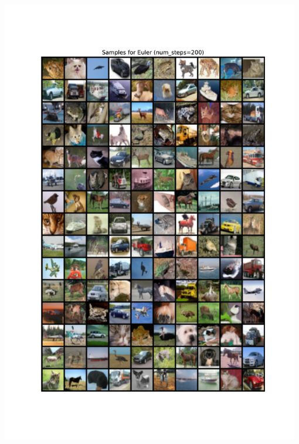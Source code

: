 \documentclass[a4paper]{article}
\begin{document}
    \newpage
    \includegraphics[width=0.98\textwidth]{data/Samples_for_Euler_(num_steps=200).pdf}
    \newpage
\end{document}
